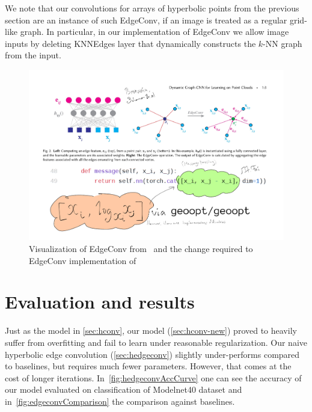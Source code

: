 We note that our convolutions for arrays of hyperbolic points from the previous
section are an instance of such EdgeConv, if an image is treated as a
regular grid-like graph. In particular, in our implementation of EdgeConv we
allow image inputs by deleting \textrm{KNNEdges} layer that dynamically
constructs the \( k \)-NN graph from the input.

\begin{figure}[H]\center
\includegraphics[width=.9\textwidth]{art/hyperbolic-edgeconv.pdf}
\caption{
    Visualization of EdgeConv from~\citet{edgeconv} and the change
        required to EdgeConv implementation of~\citet{pytorchGeometric}
}
\end{figure}

\section{Evaluation and results} \label{sec:results}

Just as the model in \autoref{sec:hconv}, our model (\autoref{sec:hconv-new})
proved to heavily suffer from overfitting and fail to learn under reasonable
regularization.  Our
naive hyperbolic edge convolution (\autoref{sec:hedgeconv}) slightly
under-performs compared to
baselines, but requires much fewer parameters. However, that comes at the cost of
longer iterations. In~\autoref{fig:hedgeconvAccCurve} one can see
the accuracy of our model evaluated on classification of Modelnet40
dataset and in~\autoref{fig:edgeconvComparison} the comparison
against baselines.

